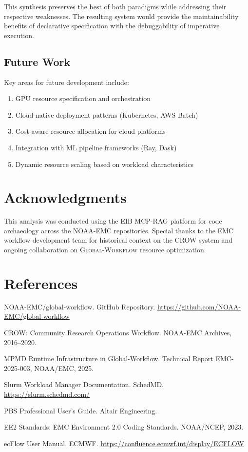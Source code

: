 \documentclass[11pt,twoside]{article}
\newcommand{\crow}{\textsc{CROW}}
\newcommand{\gw}{\textsc{Global-Workflow}}
\newcommand{\mpmd}{\textsc{MPMD}}
\begin{document}
This synthesis preserves the best of both paradigms while addressing their respective weaknesses. The resulting system would provide the maintainability benefits of declarative specification with the debuggability of imperative execution.

\subsection{Future Work}

Key areas for future development include:
\begin{enumerate}[leftmargin=2em]
    \item GPU resource specification and orchestration
    \item Cloud-native deployment patterns (Kubernetes, AWS Batch)
    \item Cost-aware resource allocation for cloud platforms
    \item Integration with ML pipeline frameworks (Ray, Dask)
    \item Dynamic resource scaling based on workload characteristics
\end{enumerate}

\section*{Acknowledgments}

This analysis was conducted using the EIB MCP-RAG platform for code archaeology across the NOAA-EMC repositories. Special thanks to the EMC workflow development team for historical context on the \crow{} system and ongoing collaboration on \gw{} resource optimization.

\section*{References}

\begin{enumerate}[leftmargin=2em, label={[\arabic*]}]
    \item NOAA-EMC/global-workflow. GitHub Repository. \url{https://github.com/NOAA-EMC/global-workflow}
    
    \item CROW: Community Research Operations Workflow. NOAA-EMC Archives, 2016--2020.
    
    \item \mpmd{} Runtime Infrastructure in Global-Workflow. Technical Report EMC-2025-003, NOAA/EMC, 2025.
    
    \item Slurm Workload Manager Documentation. SchedMD. \url{https://slurm.schedmd.com/}
    
    \item PBS Professional User's Guide. Altair Engineering.
    
    \item EE2 Standards: EMC Environment 2.0 Coding Standards. NOAA/NCEP, 2023.
    
    \item ecFlow User Manual. ECMWF. \url{https://confluence.ecmwf.int/display/ECFLOW}
\end{enumerate}
\end{document}
